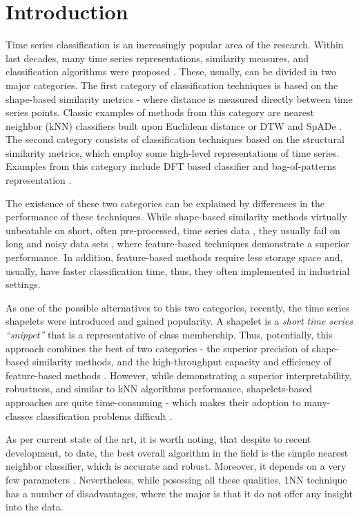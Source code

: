 \documentclass{llncs}
\begin{document}
\section{Introduction}
%
Time series classification is an increasingly popular area of the research. 
Within last decades, many time series representations, similarity measures, 
and classification algorithms were proposed \cite{review}. 
These, usually, can be divided in two major categories. 
The first category of classification techniques is based on the shape-based 
similarity metrics - where distance is measured directly between time series points. 
Classic examples of methods from this category are nearest neighbor (kNN)
classifiers built upon Euclidean distance or DTW \cite{1NN} and SpADe \cite{spade}. 
The second category consists of classification techniques based on the 
structural similarity metrics, which employ some high-level representations 
of time series. Examples from this category include DFT based classifier \cite{DFT}
and bag-of-patterns representation \cite{bag_patterns}. 

The existence of these two categories can be explained by differences in the 
performance of these techniques. 
While shape-based similarity methods virtually unbeatable on short, often pre-processed,
time series data \cite{benchmark}, 
they usually fail on long and noisy data sets \cite{indexing},
where feature-based techniques demonstrate a superior performance. 
In addition, feature-based methods require less storage space and, usually, 
have faster classification time, thus, they often implemented in industrial settings. 

As one of the possible alternatives to this two categories, recently, the time series shapelets
were introduced \cite{shapelet} and gained popularity. A shapelet is a \textit{short time series 
``snippet''} that is a representative of class membership. Thus, potentially, this approach combines
the best of two categories - the superior precision of shape-based similarity methods, and the
high-throughput capacity and efficiency of feature-based methods \cite{logical}. However, while
demonstrating a superior interpretability, robustness, and similar to kNN algorithms performance,
shapelets-based approaches are quite time-consuming - which makes their adoption to many-classes
classification problems difficult \cite{bagnal}. 

As per current state of the art, it is worth noting, that despite to recent development, to date,
the
best overall algorithm in the field is the simple nearest neighbor classifier, which is accurate
and robust. Moreover, it depends on a very few parameters \cite{benchmark} \cite{comparison}
\cite{classifiers}. Nevertheless, while posessing all these qualities, 1NN
technique has a number of disadvantages, where the major is that it do not offer any 
insight into the data.
\end{document}
